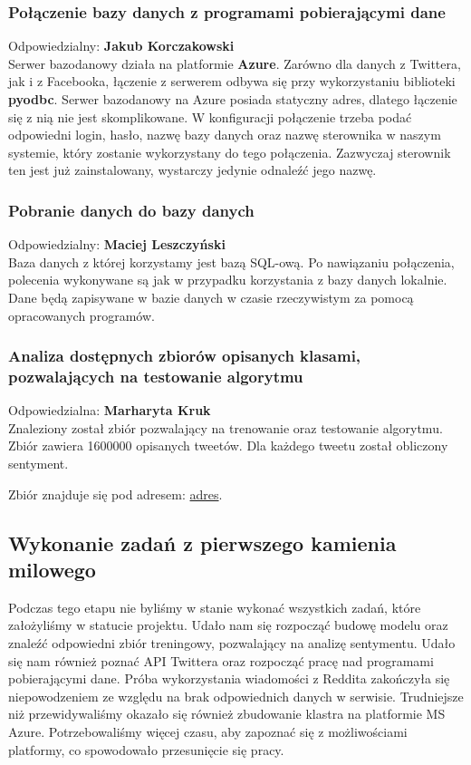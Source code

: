 \documentclass[a4paper,11pt, notitlepage ]{article}
\begin{document}
    \subsubsection{Połączenie bazy danych z programami pobierającymi dane}
    Odpowiedzialny: \textbf{Jakub Korczakowski}\\
    Serwer bazodanowy działa na platformie \textbf{Azure}. Zarówno dla danych z Twittera, jak i z Facebooka, łączenie z serwerem odbywa się przy wykorzystaniu biblioteki \textbf{pyodbc}. Serwer bazodanowy na Azure posiada statyczny adres, dlatego łączenie się z nią nie jest skomplikowane. W konfiguracji połączenie trzeba podać odpowiedni login, hasło, nazwę bazy danych oraz nazwę sterownika w naszym systemie, który zostanie wykorzystany do tego połączenia. Zazwyczaj sterownik ten jest już zainstalowany, wystarczy jedynie odnaleźć jego nazwę.
    \subsubsection{Pobranie danych do bazy danych}
    Odpowiedzialny: \textbf{Maciej Leszczyński}\\
    Baza danych z której korzystamy jest bazą SQL-ową. Po nawiązaniu połączenia, polecenia wykonywane są jak w przypadku korzystania z bazy danych lokalnie. Dane będą zapisywane w bazie danych w czasie rzeczywistym za pomocą opracowanych programów.
    \subsubsection{Analiza dostępnych zbiorów opisanych klasami, pozwalających na testowanie algorytmu} 
    Odpowiedzialna: \textbf{Marharyta Kruk}\\
    Znaleziony został zbiór pozwalający na trenowanie oraz testowanie algorytmu. Zbiór zawiera 1600000 opisanych tweetów. Dla każdego tweetu został obliczony sentyment. 
    
    Zbiór znajduje się pod adresem: \href{https://www.kaggle.com/kazanova/sentiment140}{adres}.
    

\subsection{Wykonanie zadań z pierwszego kamienia milowego}
Podczas tego etapu nie byliśmy w stanie wykonać wszystkich zadań, które założyliśmy w statucie projektu. Udało nam się rozpocząć budowę modelu oraz znaleźć odpowiedni zbiór treningowy, pozwalający na analizę sentymentu. Udało się nam również poznać API Twittera oraz rozpocząć pracę nad programami pobierającymi dane. Próba wykorzystania wiadomości z Reddita zakończyła się niepowodzeniem ze względu na brak odpowiednich danych w serwisie. Trudniejsze niż przewidywaliśmy okazało się również zbudowanie klastra na platformie MS Azure. Potrzebowaliśmy więcej czasu, aby zapoznać się z możliwościami platformy, co spowodowało przesunięcie się pracy.
\end{document}
